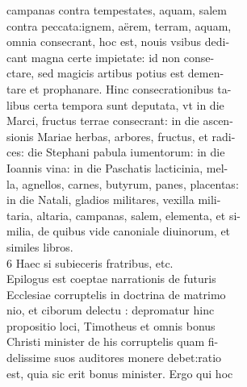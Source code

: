 \documentclass{article}
\begin{document}
\begin{pages}
                campanas contra tempestates, aquam, salem \\
                contra peccata:ignem, aërem, terram, aquam, \\
                omnia consecrant, hoc est, nouis vsibus dedi- \\
                cant magna certe impietate: id non conse- \\
                ctare, sed magicis artibus potius est demen- \\
                tare et prophanare. Hinc consecrationibus ta- \\
                libus certa tempora sunt deputata, vt in die \\
                Marci, fructus terrae consecrant: in die ascen- \\
                sionis Mariae herbas, arbores, fructus, et radi- \\
                ces: die Stephani pabula iumentorum: in die \\
                Ioannis vina: in die Paschatis lacticinia, mel- \\
                la, agnellos, carnes, butyrum, panes, placentas: \\
                in die Natali, gladios militares, vexilla mili- \\
                taria, altaria, campanas, salem, elementa, et si- \\
                milia, de quibus vide canoniale diuinorum, et \\
                similes libros. \\
                6 Haec si subieceris fratribus, etc. \\
                Epilogus est coeptae narrationis de futuris \\
                Ecclesiae corruptelis in doctrina de matrimo \\
                nio, et ciborum delectu : depromatur hinc \\
                propositio loci, Timotheus et omnis bonus \\
                Christi minister de his corruptelis quam fi- \\
                delissime suos auditores monere debet:ratio \\
                est, quia sic erit bonus minister. Ergo qui hoc \\

\end{pages}
\end{document}
